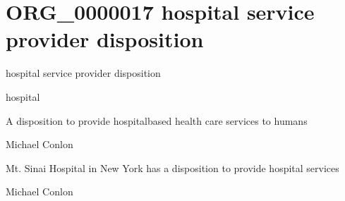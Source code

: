 \documentclass[letterpaper,10pt,english]{sphinxmanual}
\begin{document}
\section{ORG\_0000017 \sphinxhyphen{} hospital service provider disposition}
\label{\detokenize{doc-ORG_0000017:org-0000017-hospital-service-provider-disposition}}\label{\detokenize{doc-ORG_0000017:index-0}}\label{\detokenize{doc-ORG_0000017::doc}}
\begin{sphinxShadowBox}

\sphinxAtStartPar
hospital service provider disposition
\end{sphinxShadowBox}

\begin{sphinxShadowBox}

\sphinxAtStartPar
hospital
\end{sphinxShadowBox}

\begin{sphinxShadowBox}

\sphinxAtStartPar
A disposition to provide hospital\sphinxhyphen{}based health care services to humans
\end{sphinxShadowBox}

\begin{sphinxShadowBox}

\sphinxAtStartPar
Michael Conlon 
\end{sphinxShadowBox}

\begin{sphinxShadowBox}

\sphinxAtStartPar
Mt. Sinai Hospital in New York has a disposition to provide hospital services
\end{sphinxShadowBox}

\begin{sphinxShadowBox}

\sphinxAtStartPar
Michael Conlon 
\end{sphinxShadowBox}
\begin{quote}
\label{\detokenize{doc-ORG_0000018:org-0000018}}\label{\detokenize{doc-ORG_0000018:archive-disposition}}\label{\detokenize{doc-ORG_0000018:org-0000018}}
\ignorespaces \end{quote}
\end{document}

